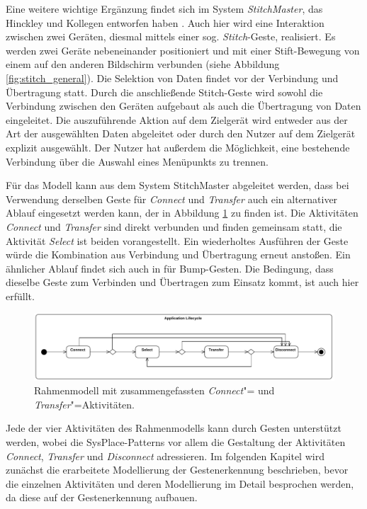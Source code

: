 Eine weitere wichtige Ergänzung findet sich im System \textit{StitchMaster}, das Hinckley und Kollegen entworfen haben \citep{Hinckley2004}. Auch hier wird eine Interaktion zwischen zwei Geräten, diesmal mittels einer sog. \textit{Stitch}-Geste, realisiert. Es werden zwei Geräte nebeneinander positioniert und mit einer Stift-Bewegung von einem auf den anderen Bildschirm verbunden (siehe Abbildung \ref{fig:stitch_general}). Die Selektion von Daten findet vor der Verbindung und Übertragung statt. Durch die anschließende Stitch-Geste wird sowohl die Verbindung zwischen den Geräten aufgebaut als auch die Übertragung von Daten eingeleitet. Die auszuführende Aktion auf dem Zielgerät wird entweder aus der Art der ausgewählten Daten abgeleitet oder durch den Nutzer auf dem Zielgerät explizit ausgewählt. Der Nutzer hat außerdem die Möglichkeit, eine bestehende Verbindung über die Auswahl eines Menüpunkts zu trennen.

Für das Modell kann aus dem System StitchMaster abgeleitet werden, dass bei Verwendung derselben Geste für \textit{Connect} und \textit{Transfer} auch ein alternativer Ablauf eingesetzt werden kann, der in Abbildung \ref{fig:model_overview_alternative} zu finden ist. Die Aktivitäten \textit{Connect} und \textit{Transfer} sind direkt verbunden und finden gemeinsam statt, die Aktivität \textit{Select} ist beiden vorangestellt. Ein wiederholtes Ausführen der Geste würde die Kombination aus Verbindung und Übertragung erneut anstoßen. Ein ähnlicher Ablauf findet sich auch in \citep{Hinckley2003} für Bump-Gesten. Die Bedingung, dass dieselbe Geste zum  Verbinden und Übertragen zum Einsatz kommt, ist auch hier erfüllt.

\begin{figure}[h!]
\centering
\includegraphics[page=2,width=1\textwidth]{bilder/lifecycle.pdf}
\caption{Rahmenmodell mit zusammengefassten \textit{Connect}"= und \textit{Transfer}"=Aktivitäten.}
\label{fig:model_overview_alternative}
\end{figure}

Jede der vier Aktivitäten des Rahmenmodells kann durch Gesten unterstützt werden, wobei die SysPlace-Patterns vor allem die Gestaltung der Aktivitäten \textit{Connect}, \textit{Transfer} und \textit{Disconnect} adressieren. Im folgenden Kapitel wird zunächst die erarbeitete Modellierung der Gestenerkennung beschrieben, bevor die einzelnen Aktivitäten und deren Modellierung im Detail besprochen werden, da diese auf der Gestenerkennung aufbauen.

